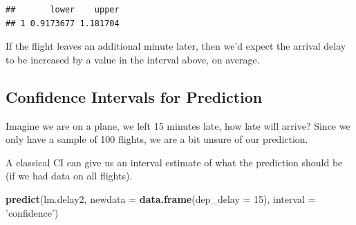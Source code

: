 \documentclass[
]{book}
\newenvironment{Shaded}{\begin{snugshade}}{\end{snugshade}}
\newcommand{\CommentTok}[1]{\textcolor[rgb]{0.56,0.35,0.01}{\textit{#1}}}
\newcommand{\DataTypeTok}[1]{\textcolor[rgb]{0.13,0.29,0.53}{#1}}
\newcommand{\DecValTok}[1]{\textcolor[rgb]{0.00,0.00,0.81}{#1}}
\newcommand{\KeywordTok}[1]{\textcolor[rgb]{0.13,0.29,0.53}{\textbf{#1}}}
\newcommand{\NormalTok}[1]{#1}
\newcommand{\OperatorTok}[1]{\textcolor[rgb]{0.81,0.36,0.00}{\textbf{#1}}}
\newcommand{\OtherTok}[1]{\textcolor[rgb]{0.56,0.35,0.01}{#1}}
\newcommand{\StringTok}[1]{\textcolor[rgb]{0.31,0.60,0.02}{#1}}
\begin{document}
\begin{Shaded}
\end{Shaded}

\begin{verbatim}
##       lower    upper
## 1 0.9173677 1.181704
\end{verbatim}

If the flight leaves an additional minute later, then we'd expect the arrival delay to be increased by a value in the interval above, on average.

\hypertarget{confidence-intervals-for-prediction}{%
\subsection{Confidence Intervals for Prediction}\label{confidence-intervals-for-prediction}}

Imagine we are on a plane, we left 15 minutes late, how late will arrive? Since we only have a sample of 100 flights, we are a bit unsure of our prediction.

A classical CI can give us an interval estimate of what the prediction should be (if we had data on all flights).

\begin{Shaded}
\begin{Highlighting}[]
\KeywordTok{predict}\NormalTok{(lm.delay2, }\DataTypeTok{newdata =} \KeywordTok{data.frame}\NormalTok{(}\DataTypeTok{dep_delay =} \DecValTok{15}\NormalTok{), }\DataTypeTok{interval =} \StringTok{'confidence'}\NormalTok{)}
\end{Highlighting}
\end{Shaded}
\end{document}

